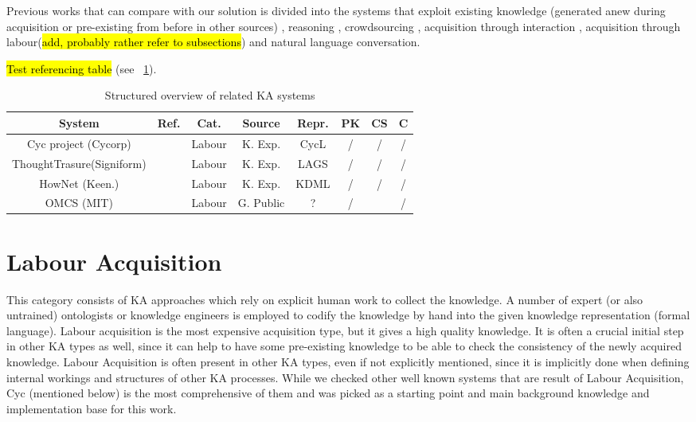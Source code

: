 Previous works that can compare with our solution is divided into the systems that exploit existing knowledge (generated anew during acquisition or pre-existing from before in other sources) \parencite{Singh2002a,Witbrock2003,Forbus2007,Kvo2010,Sharma2010,Mitchel2015}, reasoning \parencite{Witbrock2003,Speer2007,Speer2008,Kuo2010}, crowdsourcing \parencite{Singh2002,Speer2009, Kuo2010, Pedro2012a, Pedro2013}, acquisition through interaction \parencite{Speer2009,Pedro2012,Pedro2013}, acquisition through labour(\hl{add, probably rather refer to subsections}) \parencite{} and natural language conversation\parencite{Pedro2012, Speer2007,Speer2009, Witbrock2003,Kuo2010}.

\hl{Test referencing table} (see \tablename~\ref{tab:related}).

\begin{table}[htb]
	\caption{Structured overview of related KA systems}
	\label{tab:related}
	\centering
	\begin{tabular}{cccccccc}
		\hline
		System & Ref. & Cat. & Source & Repr. & PK &  CS & C \\
		\hline
		Cyc project (Cycorp) & \parencite{Lenat1995} & Labour & K. Exp. & CycL & / & / & / \\
		ThoughtTrasure(Signiform) & \parencite{Mueller2003} & Labour & K. Exp. & LAGS & / & / & / \\
		HowNet (Keen.) & \parencite{Dong2010} & Labour & K. Exp. & KDML & / & / & / \\
		OMCS (MIT) & \parencite{Singh2002} & Labour & G. Public & ? & / & \checkmark & / \\
		\hline
	\end{tabular}
\end{table}

\section{Labour Acquisition}
\label{section:LabourAcquisition}
This category consists of KA approaches which rely on explicit human work to collect the knowledge. A number of expert (or also untrained) ontologists or knowledge engineers is employed to codify the knowledge by hand into the given knowledge representation (formal language). Labour acquisition is the most expensive acquisition type, but it gives a high quality knowledge. It is often a crucial initial step in other KA types as well, since it can help to have some pre-existing knowledge to be able to check the consistency of the newly acquired knowledge. Labour Acquisition is often present in other KA types, even if not explicitly mentioned, since it is implicitly done when defining internal workings and structures of other KA processes. While we checked other well known systems that are result of Labour Acquisition, Cyc (mentioned below) is the most comprehensive of them and was picked as a starting point and main background knowledge and implementation base for this work.

